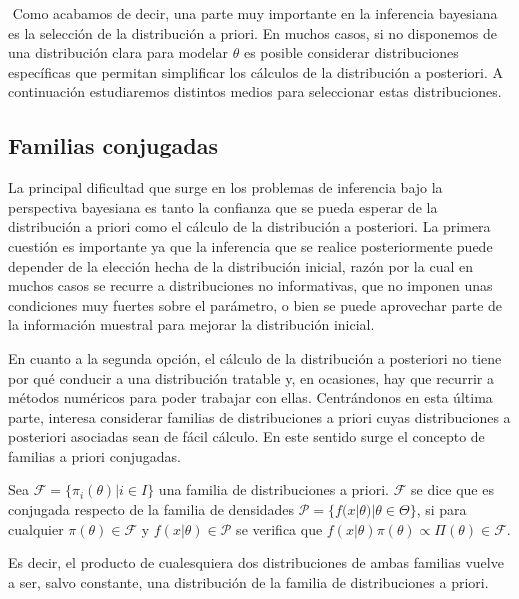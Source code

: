 \documentclass{article}
\begin{document}
$ $ \newline
Como acabamos de decir, una parte muy importante en la inferencia bayesiana es la selección de la distribución a priori. En muchos casos, si no disponemos de una distribución clara para modelar $\theta$ es posible considerar distribuciones específicas que permitan simplificar los cálculos de la distribución a posteriori. A continuación estudiaremos distintos medios para seleccionar estas distribuciones.

\subsection{Familias conjugadas}

La principal dificultad que surge en los problemas de inferencia bajo la perspectiva bayesiana es tanto la confianza que se pueda esperar de la distribución a priori como el cálculo de la distribución a posteriori. La primera cuestión es importante ya que la inferencia que se realice posteriormente puede depender de la elección hecha de la distribución inicial, razón por la cual en muchos casos se recurre a distribuciones no informativas, que no imponen unas condiciones muy fuertes sobre el parámetro, o bien se puede aprovechar parte de la información muestral para mejorar la distribución inicial.%

En cuanto a la segunda opción, el cálculo de la distribución a posteriori no tiene por qué conducir a una distribución tratable y, en ocasiones, hay que recurrir a métodos numéricos para poder trabajar con ellas. Centrándonos en esta última parte, interesa considerar familias de distribuciones a priori cuyas distribuciones a posteriori asociadas sean de fácil cálculo. En este sentido surge el concepto de familias a priori conjugadas.

\begin{definition}
	Sea $\mathcal{F} = \{\pi_i(\theta)|i\in I\}$ una familia de distribuciones a priori. $\mathcal{F}$ se dice que es conjugada respecto de la familia de densidades $\mathcal{P} = \{f(x|\theta)|\theta\in\Theta\}$, si para cualquier $\pi(\theta)\in\mathcal{F}$ y $f(x|\theta)\in \mathcal{P}$ se verifica que $f(x|\theta)\pi(\theta)\propto\Pi(\theta)\in\mathcal{F}$.

	Es decir, el producto de cualesquiera dos distribuciones de ambas familias vuelve a ser, salvo constante, una distribución de la familia de distribuciones a priori.
\end{definition}
\end{document}
